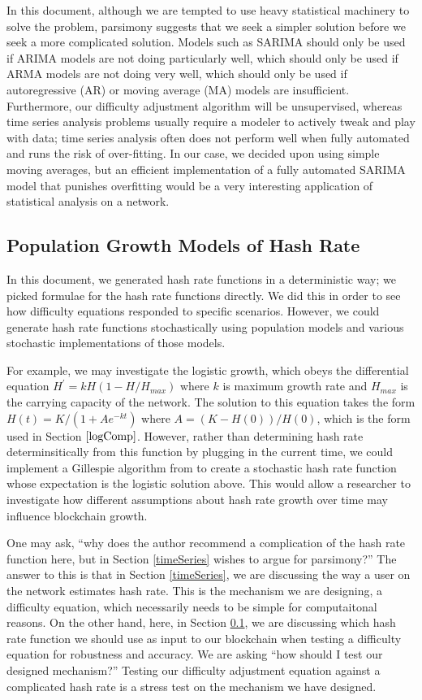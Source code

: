 \documentclass[12pt,english]{mrl}
\theoremstyle{definition}
\numberwithin{equation}{section}
\numberwithin{figure}{section}
\numberwithin{equation}{section}
\numberwithin{equation}{section}
\numberwithin{figure}{section}
\begin{document}
In this document, although we are tempted to use heavy statistical machinery to solve the problem, parsimony suggests that we seek a simpler solution before we seek a more complicated solution. Models such as SARIMA should only be used if ARIMA models are not doing particularly well, which should only be used if ARMA models are not doing very well, which should only be used if autoregressive (AR) or moving average (MA) models are insufficient. Furthermore, our difficulty adjustment algorithm will be unsupervised, whereas time series analysis problems usually require a modeler to actively tweak and play with data; time series analysis often does not perform well when fully automated and runs the risk of over-fitting. In our case, we decided upon using simple moving averages, but an efficient implementation of a fully automated SARIMA model that punishes overfitting would be a very interesting application of statistical analysis on a network.

\subsection{Population Growth Models of Hash Rate}\label{popGrowth}

In this document, we generated hash rate functions in a deterministic way; we picked formulae for the hash rate functions directly. We did this in order to see how difficulty equations responded to specific scenarios. However, we could generate hash rate functions stochastically using population models and various stochastic implementations of those models. 

For example, we may investigate the logistic growth, which obeys the differential equation $H^{\prime} = kH(1-H/H_{max})$ where $k$ is maximum growth rate and $H_{max}$ is the carrying capacity of the network. The solution to this equation takes the form $H(t) = K/(1+Ae^{-kt})$ where $A = (K-H(0))/H(0)$, which is the form used in Section $\ref{logComp}$. However, rather than determining hash rate determinsitically from this function by plugging in the current time, we could implement a Gillespie algorithm from \cite{gillespie1977exact} to create a stochastic hash rate function whose expectation is the logistic solution above. This would allow a researcher to investigate how different assumptions about hash rate growth over time may influence blockchain growth.

One may ask, ``why does the author recommend a complication of the hash rate function here, but in Section \ref{timeSeries} wishes to argue for parsimony?'' The answer to this is that in Section \ref{timeSeries}, we are discussing the way a user on the network estimates hash rate. This is the mechanism we are designing, a difficulty equation, which necessarily needs to be simple for computaitonal reasons. On the other hand, here, in Section \ref{popGrowth}, we are discussing which hash rate function we should use as input to our blockchain when testing a difficulty equation for robustness and accuracy. We are asking ``how should I test our designed mechanism?'' Testing our difficulty adjustment equation against a complicated hash rate is a stress test on the mechanism we have designed.
\end{document}
